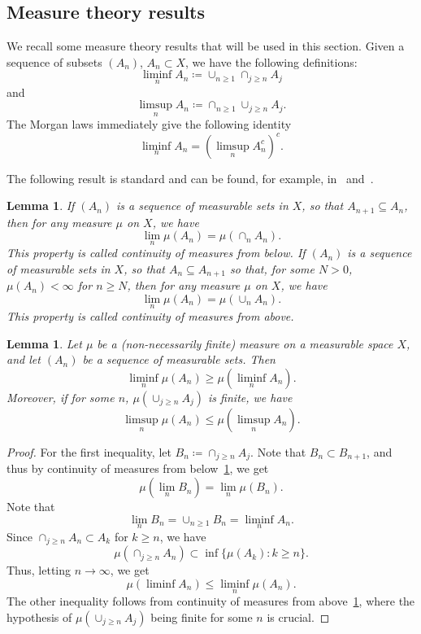 \documentclass[12pt,article]{amsart}
\numberwithin{equation}{section}
\numberwithin{figure}{section}
\newtheorem{lemma}[equation]{Lemma}
\theoremstyle{definition}
\theoremstyle{plain}
\begin{document}
\subsection{Measure theory results}

We recall some measure theory results that will be used in this section.
Given a sequence of subsets $(A_n)$, $A_n \subset X$,
we have the following definitions:
\begin{equation}
\liminf_n A_n \coloneqq \cup_{n\geq 1} \cap_{j \geq n} A_j
\label{eq:liminf}
\end{equation}
and
\begin{equation}
\limsup_n A_n \coloneqq \cap_{n\geq 1} \cup_{j \geq n} A_j.
\label{eq:limsup}
\end{equation}
The Morgan laws immediately give the following identity
\begin{equation}
\liminf_n A_n = \left( \limsup_n A_n^c \right)^c.
\label{eq:complements}
\end{equation}

The following result is standard and can be found, for example, in~\cite[Theorem~D]{Ham50:Measure} and~\cite[Theorem~E]{Ham50:Measure}.

\begin{lemma}
If $(A_n)$ is a sequence of measurable sets in $X$, so that $A_{n+1} \subseteq A_n$, then for any measure $\mu$ on $X$, we have
\[
\lim_n \mu(A_n) = \mu( \cap_n A_n).
\]
This property is called \emph{continuity of measures from below}.
If $(A_n)$ is a sequence of measurable sets in $X$, so that $A_{n} \subseteq A_{n+1}$ so that, for some $N>0$, $\mu(A_n) < \infty$ for $n \geq N$, then for any measure $\mu$ on $X$, we have
\[
\lim_n \mu(A_n) = \mu( \cup_n A_n).
\]
This property is called \emph{continuity of measures from above}.
\label{lem:cont_measures}
\end{lemma}

\begin{lemma}
Let $\mu$ be a (non-necessarily finite) measure on a measurable space $X$, and let $(A_n)$ be a sequence of measurable sets.
Then
\[
\liminf_n \mu(A_n) \geq \mu(\liminf_n A_n).
\]
Moreover, if for some $n$, $\mu \left( \cup_{j \geq n} A_j \right)$ is finite, we have
\[
\limsup_n \mu(A_n) \leq \mu(\limsup_n A_n).
\]
\label{lem:fatou}
\end{lemma}
\begin{proof}
For the first inequality, let  $B_n \coloneqq \cap_{j \geq n} A_j$.
Note that $B_{n} \subset B_{n+1}$, and thus 
by continuity of measures from below~\ref{lem:cont_measures}, we get
\[
\mu(\lim_n B_n) = \lim_n \mu(B_n).
\]
Note that
\[
\lim_n B_n = \cup_{n \geq 1} B_n = \liminf_n A_n. 
\]
Since $\cap_{j \geq n} A_n \subset A_k$ for $k \geq n$, we have
\[
\mu \left( \cap_{j \geq n} A_n \right) \subset \inf \{ \mu(A_k) \colon k \geq n \}.
\]
Thus, letting $n \to \infty$, we get
\[
\mu \left( \liminf A_n \right) \leq \liminf_n \mu(A_n).
\]
The other inequality follows from continuity of measures from above~\ref{lem:cont_measures}, where the hypothesis of $\mu \left( \cup_{j \geq n} A_j \right)$ being finite for some $n$ is crucial.
\end{proof}
\end{document}

